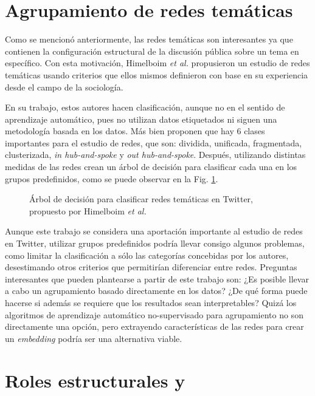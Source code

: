 \section{Agrupamiento de redes temáticas}

Como se mencionó anteriormente, las redes temáticas son interesantes ya que contienen la configuración estructural de la discusión pública sobre un tema en específico. Con esta motivación, Himelboim \textit{et al.} propusieron un estudio de redes temáticas usando criterios que ellos mismos definieron con base en su experiencia desde el campo de la sociología. 

En su trabajo, estos autores hacen clasificación, aunque no en el sentido de aprendizaje automático, pues no utilizan datos etiquetados ni siguen una metodología basada en los datos. Más bien proponen que hay 6 clases importantes para el estudio de redes, que son: dividida, unificada, fragmentada, clusterizada, \textit{in hub-and-spoke} y \textit{out hub-and-spoke}. Después, utilizando distintas medidas de las redes crean un árbol de decisión para clasificar cada una en los grupos predefinidos, como se puede observar en la Fig. \ref{fig:himelboim}.

 \begin{figure}[htbp]
   \centering
   
    \caption{Árbol de decisión para clasificar redes temáticas en Twitter, propuesto por Himelboim \textit{ et al.} \cite{himelboim_classifying_2017}} %
    \label{fig:himelboim}
\end{figure}

Aunque este trabajo se considera una aportación importante al estudio de redes en Twitter, utilizar grupos predefinidos podría llevar consigo algunos problemas, como limitar la clasificación a sólo las categorías concebidas por los autores, desestimando otros criterios que permitirían diferenciar entre redes. Preguntas interesantes que pueden plantearse a partir de este trabajo son: ¿Es posible llevar a cabo un agrupamiento basado directamente en los datos? ¿De qué forma puede hacerse si además se requiere que los resultados sean interpretables? Quizá los algoritmos de aprendizaje automático no-supervisado para agrupamiento no son directamente una opción, pero extrayendo características de las redes para crear un \textit{embedding} podría ser una alternativa viable.

\section{Roles estructurales y \graphlets}

